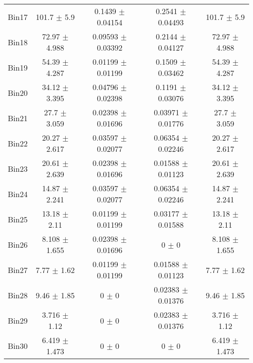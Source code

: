 \begin{tabular}{@{\extracolsep{4pt}}lcccc@{}}
     Bin17 & 101.7 $\pm$ 5.9 & 0.1439 $\pm$ 0.04154 & 0.2541 $\pm$ 0.04493 & 101.7 $\pm$ 5.9 \\ 
     Bin18 & 72.97 $\pm$ 4.988 & 0.09593 $\pm$ 0.03392 & 0.2144 $\pm$ 0.04127 & 72.97 $\pm$ 4.988 \\ 
     Bin19 & 54.39 $\pm$ 4.287 & 0.01199 $\pm$ 0.01199 & 0.1509 $\pm$ 0.03462 & 54.39 $\pm$ 4.287 \\ 
     Bin20 & 34.12 $\pm$ 3.395 & 0.04796 $\pm$ 0.02398 & 0.1191 $\pm$ 0.03076 & 34.12 $\pm$ 3.395 \\ 
     Bin21 & 27.7 $\pm$ 3.059 & 0.02398 $\pm$ 0.01696 & 0.03971 $\pm$ 0.01776 & 27.7 $\pm$ 3.059 \\ 
     Bin22 & 20.27 $\pm$ 2.617 & 0.03597 $\pm$ 0.02077 & 0.06354 $\pm$ 0.02246 & 20.27 $\pm$ 2.617 \\ 
     Bin23 & 20.61 $\pm$ 2.639 & 0.02398 $\pm$ 0.01696 & 0.01588 $\pm$ 0.01123 & 20.61 $\pm$ 2.639 \\ 
     Bin24 & 14.87 $\pm$ 2.241 & 0.03597 $\pm$ 0.02077 & 0.06354 $\pm$ 0.02246 & 14.87 $\pm$ 2.241 \\ 
     Bin25 & 13.18 $\pm$ 2.11 & 0.01199 $\pm$ 0.01199 & 0.03177 $\pm$ 0.01588 & 13.18 $\pm$ 2.11 \\ 
     Bin26 & 8.108 $\pm$ 1.655 & 0.02398 $\pm$ 0.01696 & 0 $\pm$ 0 & 8.108 $\pm$ 1.655 \\ 
     Bin27 & 7.77 $\pm$ 1.62 & 0.01199 $\pm$ 0.01199 & 0.01588 $\pm$ 0.01123 & 7.77 $\pm$ 1.62 \\ 
     Bin28 & 9.46 $\pm$ 1.85 & 0 $\pm$ 0 & 0.02383 $\pm$ 0.01376 & 9.46 $\pm$ 1.85 \\ 
     Bin29 & 3.716 $\pm$ 1.12 & 0 $\pm$ 0 & 0.02383 $\pm$ 0.01376 & 3.716 $\pm$ 1.12 \\ 
     Bin30 & 6.419 $\pm$ 1.473 & 0 $\pm$ 0 & 0 $\pm$ 0 & 6.419 $\pm$ 1.473 \\ 
\hline\hline
  \end{tabular}
